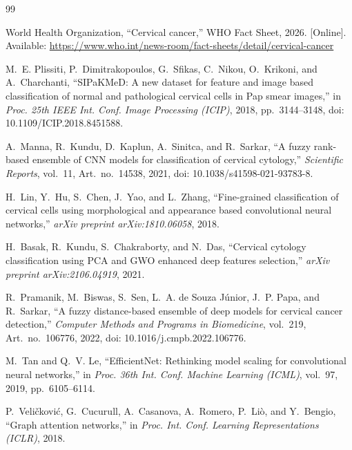 \documentclass[10pt,conference]{IEEEtran}
\begin{document}
\begin{thebibliography}{99}
\scriptsize
\setlength{\itemsep}{0pt}
\setlength{\parskip}{0pt}

World Health Organization,
``Cervical cancer,''
WHO Fact Sheet, 2026.
[Online]. Available: \url{https://www.who.int/news-room/fact-sheets/detail/cervical-cancer}

M.~E. Plissiti, P.~Dimitrakopoulos, G.~Sfikas, C.~Nikou,
O.~Krikoni, and A.~Charchanti,
``SIPaKMeD: A new dataset for feature and image based classification of normal and pathological cervical cells in Pap smear images,''
in \emph{Proc. 25th IEEE Int. Conf. Image Processing (ICIP)},
2018, pp.~3144--3148,
doi: 10.1109/ICIP.2018.8451588.

A.~Manna, R.~Kundu, D.~Kaplun, A.~Sinitca, and R.~Sarkar,
``A fuzzy rank-based ensemble of CNN models for classification of cervical cytology,''
\emph{Scientific Reports}, vol.~11, Art.~no.~14538, 2021,
doi: 10.1038/s41598-021-93783-8.

H.~Lin, Y.~Hu, S.~Chen, J.~Yao, and L.~Zhang,
``Fine-grained classification of cervical cells using morphological and appearance based convolutional neural networks,''
\emph{arXiv preprint arXiv:1810.06058}, 2018.

H.~Basak, R.~Kundu, S.~Chakraborty, and N.~Das,
``Cervical cytology classification using PCA and GWO enhanced deep features selection,''
\emph{arXiv preprint arXiv:2106.04919}, 2021.

R.~Pramanik, M.~Biswas, S.~Sen, L.~A. de Souza J\'unior,
J.~P. Papa, and R.~Sarkar,
``A fuzzy distance-based ensemble of deep models for cervical cancer detection,''
\emph{Computer Methods and Programs in Biomedicine},
vol.~219, Art.~no.~106776, 2022,
doi: 10.1016/j.cmpb.2022.106776.

M.~Tan and Q.~V. Le,
``EfficientNet: Rethinking model scaling for convolutional neural networks,''
in \emph{Proc. 36th Int. Conf. Machine Learning (ICML)},
vol.~97, 2019, pp.~6105--6114.

P.~Veli\v{c}kovi\'c, G.~Cucurull, A.~Casanova, A.~Romero,
P.~Li\`o, and Y.~Bengio,
``Graph attention networks,''
in \emph{Proc. Int. Conf. Learning Representations (ICLR)}, 2018.


\end{thebibliography}
\end{document}
